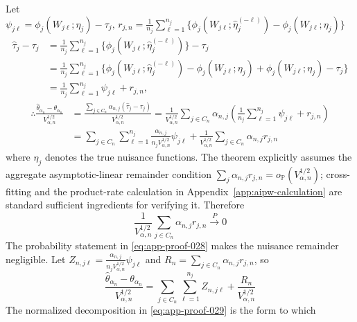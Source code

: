 \documentclass[11pt]{article}
\numberwithin{equation}{section}
\newcommand{\Pbb}{\mathbb P}
\newcommand{\1}{\mathbf 1}
\begin{document}
Let \(\psi_{j\ell}=\phi_j(W_{j\ell};\eta_j)-\tau_j,\, r_{j,n}=\frac1{n_j}\sum_{\ell=1}^{n_j}\{\phi_j(W_{j\ell};\widehat\eta_j^{(-\ell)})-\phi_j(W_{j\ell};\eta_j)\}\)
\begin{equation}
\label{eq:app-proof-026}
\begin{aligned}
  \widehat\tau_j-\tau_j
  &=\frac1{n_j}\sum_{\ell=1}^{n_j}\{\phi_j(W_{j\ell};\widehat\eta_j^{(-\ell)})\}-\tau_j\\
  &=\frac1{n_j}\sum_{\ell=1}^{n_j}\{\phi_j(W_{j\ell};\widehat\eta_j^{(-\ell)})-\phi_j(W_{j\ell};\eta_j)+\phi_j(W_{j\ell};\eta_j)-\tau_j\}\\
  &=\frac1{n_j}\sum_{\ell=1}^{n_j}\psi_{j\ell}+r_{j,n},
\end{aligned}
\end{equation}
\begin{equation}
\label{eq:app-proof-027}
\begin{aligned}
\therefore\frac{\widehat\theta_{\alpha_n}-\theta_{\alpha_n}}{V_{\alpha,n}^{1/2}}
&=\frac{\sum_{j\in C_n}\alpha_{n,j}(\widehat\tau_j-\tau_j)}{V_{\alpha,n}^{1/2}}=\frac1{V_{\alpha,n}^{1/2}}\sum_{j\in C_n}\alpha_{n,j}(\frac1{n_j}\sum_{\ell=1}^{n_j}\psi_{j\ell}+r_{j,n})\\
&=\sum_{j\in C_n}\sum_{\ell=1}^{n_j}\frac{\alpha_{n,j}}{n_jV_{\alpha,n}^{1/2}}\psi_{j\ell}+\frac1{V_{\alpha,n}^{1/2}}\sum_{j\in C_n}\alpha_{n,j}r_{j,n}
\end{aligned}
\end{equation}
where \(\eta_j\) denotes the true nuisance functions.  The theorem explicitly assumes the aggregate asymptotic-linear remainder condition \(\sum_j\alpha_{n,j}r_{j,n}=o_{\Pbb}(V_{\alpha,n}^{1/2})\); cross-fitting and the product-rate calculation in Appendix~\ref{app:aipw-calculation} are standard sufficient ingredients for verifying it.  Therefore
\begin{equation}
\label{eq:app-proof-028}
\frac1{V_{\alpha,n}^{1/2}}\sum_{j\in C_n}\alpha_{n,j}r_{j,n}\xrightarrow{P}0
\end{equation}
The probability statement in \eqref{eq:app-proof-028} makes the nuisance
remainder negligible.  Let
\(Z_{n,j\ell}=\frac{\alpha_{n,j}}{n_jV_{\alpha,n}^{1/2}}\psi_{j\ell}\) and
\(R_n=\sum_{j\in C_n}\alpha_{n,j}r_{j,n}\), so
\begin{equation}
\label{eq:app-proof-029}
\frac{\widehat\theta_{\alpha_n}-\theta_{\alpha_n}}{V_{\alpha,n}^{1/2}}=\sum_{j\in C_n}\sum_{\ell=1}^{n_j}Z_{n,j\ell}+\frac{R_n}{V_{\alpha,n}^{1/2}}
\end{equation}
The normalized decomposition in \eqref{eq:app-proof-029} is the form to which
\end{document}

